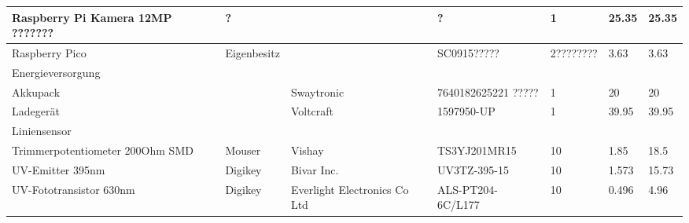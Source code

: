 \documentclass[main.tex]{subfiles} %
\begin{document}
\begin{table}[h]
{\begin{tabular}{|p{3cm}|p{2.5cm}|p{2.5cm}|p{3cm}|p{1cm}|p{1.5cm}|p{1cm}|}
            Raspberry Pi Kamera 12MP ???????        & ?                  &                              & ?                       & 1               & 25.35                     & 25.35                       \\ \hline
            Raspberry Pico                          & Eigenbesitz        &                              & SC0915?????             & 2????????       & 3.63                      & 3.63                        \\ \hline
            \rowcolor{lightgray} Energieversorgung  &                    &                              &                         &                 &                           &                                 \\ \hline
            Akkupack                                &                    & Swaytronic                   & 7640182625221 ?????     & 1               & 20                        & 20                        \\ \hline
            Ladegerät                               &                    & Voltcraft                    & 1597950-UP              & 1               & 39.95                     & 39.95                           \\ \hline
            \rowcolor{lightgray} Liniensensor       &                    &                              &                         &                 &                           &                             \\ \hline
            Trimmerpotentiometer 200Ohm SMD         & Mouser             & Vishay                       & TS3YJ201MR15            & 10              & 1.85                      & 18.5                        \\ \hline
            UV-Emitter 395nm                        & Digikey            & Bivar Inc.                   & UV3TZ-395-15            & 10              & 1.573                     & 15.73                       \\ \hline
            UV-Fototransistor 630nm                 & Digikey            & Everlight Electronics Co Ltd & ALS-PT204-6C/L177       & 10              & 0.496                     & 4.96                        \\ \hline

\end{tabular}}
\end{table}
\end{document}
